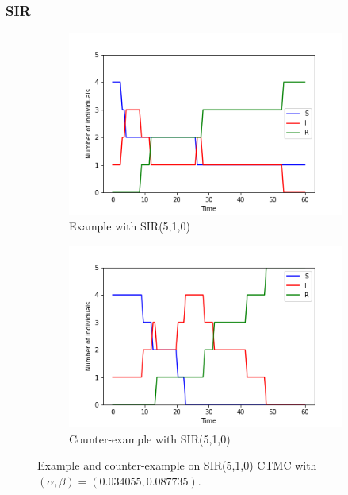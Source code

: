 \documentclass{beamer}
\begin{document}
\begin{frame}
    \frametitle{SIR}
    \begin{figure}[H]
        \centering
        \begin{subfigure}{0.4\textwidth}
            \centering
            \includegraphics[width=\linewidth]{figures/sir_510_trace_1.png}
            \caption{Example with SIR(5,1,0)}
        \end{subfigure}
        \hfill
        \begin{subfigure}{0.4\textwidth}
            \centering
            \includegraphics[width=\linewidth]{figures/sir_510_trace_2.png}
            \caption{Counter-example with SIR(5,1,0)}
        \end{subfigure}
        \caption{Example and counter-example on SIR(5,1,0) CTMC with $(\alpha, \beta)=(0.034055, 0.087735)$.}
    \end{figure}
\end{frame}
\end{document}
